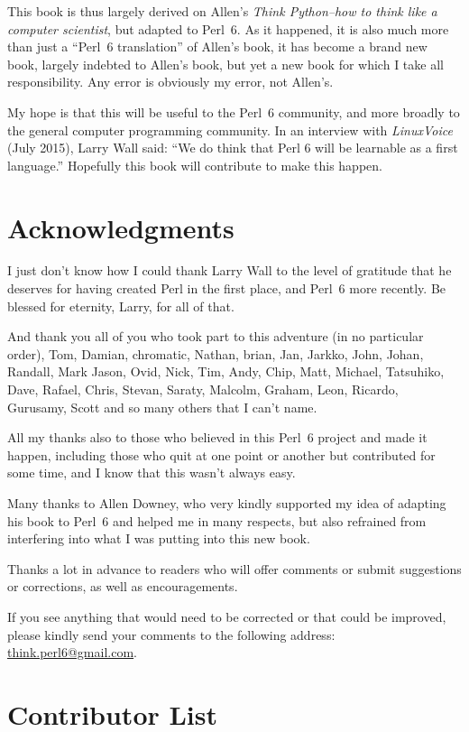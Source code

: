 This book is thus largely derived on Allen's \emph{Think Python--how 
to think like a computer scientist}, but adapted to Perl~6. As 
it happened, it is also much more than just a ``Perl~6 
translation'' of Allen's book, it has become a brand new book, 
largely indebted to Allen's book, but yet a new book for which 
I take all responsibility. Any error is obviously my error, 
not Allen's.

My hope is that this will be useful to the Perl~6 community, and 
more broadly to the general computer programming community. In 
an interview with \emph{LinuxVoice} (July 2015), Larry Wall said: 
``We do think that Perl 6 will be learnable as a first language.''
Hopefully this book will contribute to make this happen. 

\section*{Acknowledgments}

I just don't know how I could thank Larry Wall to the level of 
gratitude that he deserves for having created Perl in the first 
place, and Perl~6 more recently. Be blessed for eternity, Larry, 
for all of that. 

And thank you all of you who took part to this 
adventure (in no particular order), Tom, Damian, 
chromatic, Nathan, brian, Jan, Jarkko, John, Johan, Randall, 
Mark Jason, Ovid, Nick, Tim, Andy, Chip, Matt, Michael, Tatsuhiko, 
Dave, Rafael, Chris, Stevan, Saraty, Malcolm, Graham, Leon, 
Ricardo, Gurusamy, Scott and so many others that I can't name.  

All my thanks also to those who believed in 
this Perl~6 project and made it happen, including those who 
quit at one point or another but contributed for some 
time, and I know that this wasn't always easy.

Many thanks to Allen Downey, who very kindly supported my idea of 
adapting his book to Perl~6 and helped me in many respects, but 
also refrained from interfering into what I was putting into 
this new book.

Thanks a lot in advance to readers who will offer comments 
or submit suggestions or corrections, as well as encouragements.

If you see anything that would need to be corrected or that 
could be improved, please kindly send your comments to the 
following address: \url{think.perl6@gmail.com}.


\section*{Contributor List}

